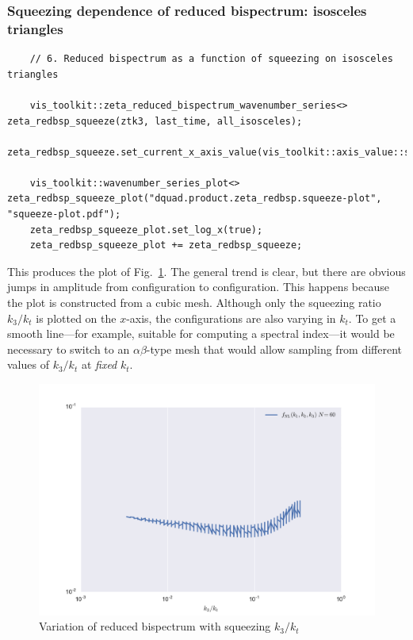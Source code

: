 \documentclass[11pt,a4paper]{article}
\begin{document}
\subsubsection{Squeezing dependence of reduced bispectrum: isosceles triangles}
\begin{verbatim}
    // 6. Reduced bispectrum as a function of squeezing on isosceles triangles

    vis_toolkit::zeta_reduced_bispectrum_wavenumber_series<> zeta_redbsp_squeeze(ztk3, last_time, all_isosceles);
    zeta_redbsp_squeeze.set_current_x_axis_value(vis_toolkit::axis_value::squeeze_k3);

    vis_toolkit::wavenumber_series_plot<> zeta_redbsp_squeeze_plot("dquad.product.zeta_redbsp.squeeze-plot", "squeeze-plot.pdf");
    zeta_redbsp_squeeze_plot.set_log_x(true);
    zeta_redbsp_squeeze_plot += zeta_redbsp_squeeze;
\end{verbatim}
This produces the plot of Fig.~\ref{fig:squeeze-plot}.
The general trend is clear, but there are obvious jumps in amplitude
from configuration to configuration.
This happens because the plot is constructed from a cubic mesh.
Although only the squeezing ratio $k_3/k_t$ is plotted on the $x$-axis,
the configurations are also varying in $k_t$.
To get a smooth line---for example, suitable for computing a spectral index---it
would be necessary to switch to an $\alpha\beta$-type mesh
that would allow sampling from different values of $k_3/k_t$ at
\emph{fixed} $k_t$.
\begin{figure}
    \begin{center}
        \includegraphics[scale=0.75]{Outputs/squeeze-plot}    
    \end{center}
    \caption{\label{fig:squeeze-plot}Variation of reduced bispectrum with squeezing
    $k_3/k_t$}
\end{figure}
\end{document}

